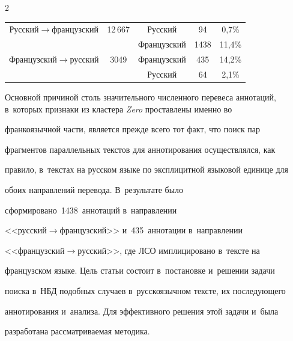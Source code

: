 \begin{multicols}{2}
\begin{table}
\begin{center}
\begin{tabular}{|c|c|c|c|c|}
Русский\;$\to$\;французский&12\,667&Русский&\hphantom{9}94&0,7\%\\ 


&&Французский&1438\hphantom{9}&11,4\%\\


   \hline 


Французский\;$\to$\;русский&\hphantom{9\,}3049&Французский&435&14,2\%\\ 


&&Русский&\hphantom{9}64&2,1\%\\


   \hline


   \end{tabular}


   \end{center}


   \vspace*{-6pt}


   \end{table}





   Основной причиной столь значительного чис\-лен\-но\-го перевеса аннотаций, в~которых признаки из кластера \textit{Zero} проставлены именно во 


франкоязычной части, является прежде всего тот факт, что поиск пар 


фрагментов параллельных текстов для аннотирования осуществлялся, как 


правило, в~текстах на русском языке по эксплицитной языковой единице для 


обоих направлений перевода. В~результате было 


сформировано~1438~аннотаций в~направлении  


<<рус\-ский\;$\to$\;фран\-цуз\-ский>> и~435~аннотации в~направлении 


<<фран\-цуз\-ский\;$\to$\;рус\-ский>>, где ЛСО имплицировано в~тексте на 


французском языке. Цель статьи состоит в~постановке и~решении задачи 


поиска в~НБД подобных случаев в~русскоязычном тексте, их последующего 


аннотирования и~анализа. Для эффективного решения этой задачи и~была 


разработана рассматриваемая методика.





\vspace*{-6pt}



\end{multicols}
